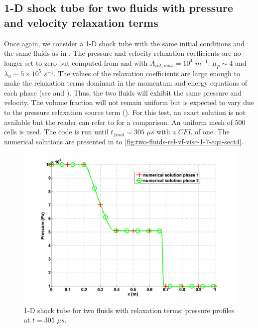 \subsection{1-D shock tube for two fluids with pressure and velocity relaxation terms}\label{sec:1d-2-phases-rel-7-eq-sct4}
Once again, we consider a 1-D shock tube with the same initial conditions and the same fluids as in . The pressure and velocity relaxation coefficients are no longer set to zero but computed from  and  with $A_{int,max} =  10^4$ $m^{-1}$: $\mu_P \sim 4$ and $\lambda_u \sim 5 \times 10^5$ $s^{-1}$. The values of the relaxation coefficients are large enough to make the relaxation terms dominant in the momentum and energy equations of each phase (see  and ). Thus, the two fluids will exhibit the same pressure and velocity. The volume fraction will not remain uniform but is expected to vary due to the pressure relaxation source term (). For this test, an exact solution is not available but the reader can refer to \cite{Saurel_2007} for a comparison. An uniform mesh of 500 cells is used. The code is run until $t_{final} = 305$ $\mu s$ with a $CFL$ of one. The numerical solutions are presented in  to \ref{fig:two-fluids-rel-vf-visc-1-7-eqn-sect4}.
%
\begin{figure}[H]
\centering
\includegraphics[width=\textwidth]{figures/SEM/relaxation_two_phases_pressure.png}
\caption{1-D shock tube for two fluids with relaxation terms: pressure profiles at $t=305$ $\mu s$.}
\label{fig:two-fluids-rel-press-7-eqn-sect4}
\end{figure}
